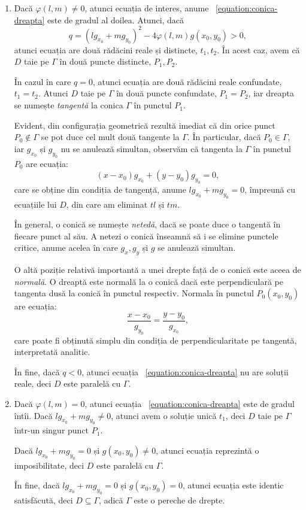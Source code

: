 \documentclass[11pt,a4paper]{article}
\newcommand\seq{\subseteq}
\theoremstyle{dotless}
\theoremstyle{dotlessdr}
\begin{document}
\begin{enumerate}[(1)]
	\item Dacă $\varphi(l, m) \neq 0$, atunci ecuația de interes, anume
~\eqref{equation:conica-dreapta} este de gradul al doilea. Atunci, dacă\[
	q = (l g_{x_0} + mg_{y_0})^2 - 4 \varphi(l, m)g(x_0, y_0) > 0,
\]
atunci ecuația are două rădăcini reale și distincte, $t_1, t_2$. În acest caz,
avem că $D$ taie pe $\Gamma$ în două puncte distincte, $P_1, P_2$.

În cazul în care $q = 0$, atunci ecuația are două rădăcini reale confundate,
$t_1 = t_2$. Atunci $D$ taie pe $\Gamma$ în două puncte confundate, $P_1 = P_2$,
iar dreapta se numește \emph{tangentă} la conica $\Gamma$ în punctul $P_1$.

Evident, din configurația geometrică rezultă imediat că din orice punct 
$P_0 \notin \Gamma$ se pot duce cel mult două tangente la $\Gamma$. În 
particular, dacă $P_0 \in \Gamma$, iar $g_{x_0}$ și $g_{y_0}$ nu se anulează
simultan, observăm că tangenta la $\Gamma$ în punctul $P_0$ are ecuația: 
 \[
	(x - x_0) g_{x_0} + (y - y_0) g_{y_0} = 0,
\]
care se obține din condiția de tangență, anume $l g_{x_0} + mg_{y_0} = 0$,
împreună cu ecuațiile lui $D$, din care am eliminat $tl$ și $tm$.

În general, o conică se numește \emph{netedă}, dacă se poate duce o tangentă
în fiecare punct al său. A netezi o conică înseamnă să i se elimine punctele
critice, anume acelea în care $g_x, g_y$ și $g$ se anulează simultan.

O altă poziție relativă importantă a unei drepte față de o conică este aceea de
\emph{normală}. O dreaptă este normală la o conică dacă este perpendiculară pe
tangenta dusă la conică în punctul respectiv. Normala în punctul $P_0(x_0, y_0)$
are ecuația: 
 \[
	\dfrac{x - x_0}{g_{y_0}} = \dfrac{y - y_0}{g_{x_0}},
\]
care poate fi obținută simplu din condiția de perpendicularitate pe tangentă,
interpretată analitic.

În fine, dacă $q < 0$, atunci ecuația ~\eqref{equation:conica-dreapta} nu are
soluții reale, deci $D$ este paralelă cu $\Gamma$.

\item Dacă $\varphi(l, m) = 0$, atunci ecuația ~\eqref{equation:conica-dreapta}
este de gradul întîi. Dacă $lg_{x_0} + mg_{y_0} \neq 0$, atunci avem o soluție
unică $t_1$, deci $D$ taie pe $\Gamma$ într-un singur punct $P_1$.

Dacă $lg_{x_0} + mg_{y_0} = 0$ și $g(x_0, y_0) \neq 0$, atunci ecuația
reprezintă o imposibilitate, deci $D$ este paralelă cu $\Gamma$.

În fine, dacă $lg_{x_0} + mg_{y_0} = 0$ și $g(x_0, y_0) = 0$, atunci ecuația
este identic satisfăcută, deci $D \seq \Gamma$, adică $\Gamma$ este o pereche
de drepte.
\end{enumerate}
\end{document}
